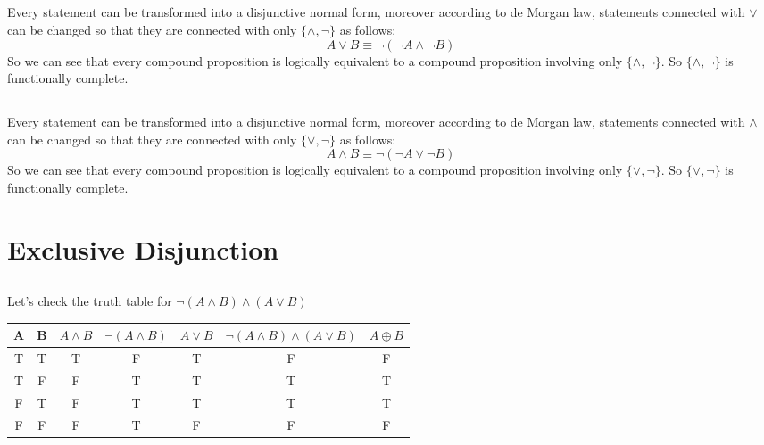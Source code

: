 \documentclass[a4paper,12pt,titlepage]{article}
\begin{document}
\subsection{}
\paragraph{}
Every statement can be transformed into a disjunctive normal form, moreover according to  de Morgan law, statements connected with $\vee$ can be changed so that they are connected with only $\lbrace\wedge,\neg\rbrace$ as follows:
$$A\vee B\equiv \neg (\neg A\wedge \neg B)$$
So we can see that every compound proposition is logically equivalent to a compound proposition involving only $\lbrace\wedge,\neg\rbrace$. So $\lbrace\wedge,\neg\rbrace$ is functionally complete.


\subsection{}
Every statement can be transformed into a disjunctive normal form, moreover according to  de Morgan law, statements connected with $\wedge$ can be changed so that they are connected with only $\lbrace\vee,\neg\rbrace$ as follows:
$$A\wedge B\equiv \neg (\neg A\vee \neg B)$$
So we can see that every compound proposition is logically equivalent to a compound proposition involving only $\lbrace\vee,\neg\rbrace$. So $\lbrace\vee,\neg\rbrace$ is functionally complete.



\section{Exclusive Disjunction}
\subsection{}
\paragraph{}Let's check the truth table for $\neg (A\wedge B)\wedge(A\vee B)$ 

\begin{table}[H]
\newcommand{\tabincell}[2]{\begin{tabular}{@{}#1@{}}#2\end{tabular}}
  \centering
\begin{tabular}{|c|c|c|c|c|c|c|}
\hline
\hline
A & B & $A\wedge B$ & $\neg (A\wedge B)$ & $A\vee B$ & $\neg (A \wedge B)\wedge(A\vee B)$ &$A\oplus B$\\
\hline
T & T & T & F & T & F & F\\
\hline
T & F & F & T & T & T & T\\
\hline
F & T & F & T & T & T & T\\
\hline
F & F & F & T & F & F & F\\
\hline
\hline
\end{tabular}
\end{table}
\end{document}
